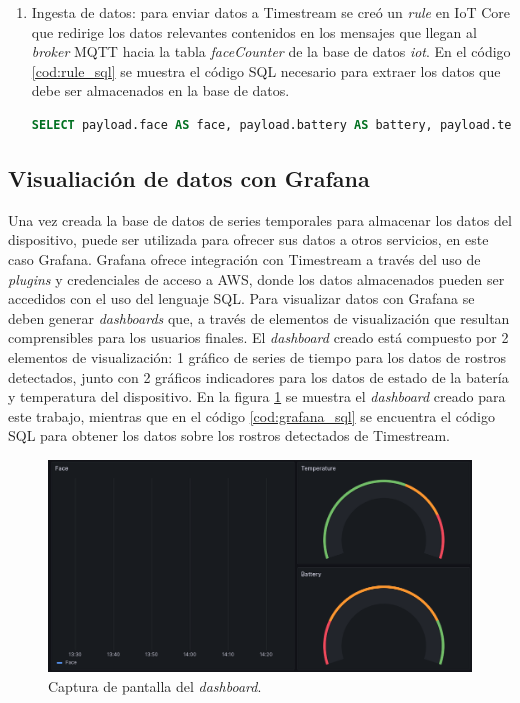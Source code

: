 \begin{enumerate}
	\item Ingesta de datos: para enviar datos a Timestream se creó un \textit{rule} en IoT Core que redirige los datos relevantes contenidos en los mensajes que llegan al \textit{broker} MQTT hacia la tabla \textit{faceCounter} de la base de datos \textit{iot}. En el código \ref{cod:rule_sql} se muestra el código SQL necesario para extraer los datos que debe ser almacenados en la base de datos.
\begin{lstlisting}[language=SQL, label=cod:rule_sql,caption=Código SQL del \textit{rule} para alcenar datos en Timestream.]
SELECT payload.face AS face, payload.battery AS battery, payload.temperature AS temperature FROM 'faceCounter/data_in'
\end{lstlisting}	
	
\end{enumerate}

\subsection{Visualiación de datos con Grafana}
Una vez creada la base de datos de series temporales para almacenar los datos del dispositivo, puede ser utilizada para ofrecer sus datos a otros servicios, en este caso Grafana. Grafana ofrece integración con Timestream a través del uso de \textit{plugins} y credenciales de acceso a AWS, donde los datos almacenados pueden ser accedidos con el uso del lenguaje SQL. Para visualizar datos con Grafana se deben generar \textit{dashboards} que, a través de elementos de visualización que resultan comprensibles para los usuarios finales. El \textit{dashboard} creado está compuesto por 2 elementos de visualización: 1 gráfico de series de tiempo para los datos de rostros detectados, junto con 2 gráficos indicadores para los datos de estado de la batería y temperatura del dispositivo. En la figura \ref{fig:gr_dashboard} se muestra el \textit{dashboard} creado para este trabajo, mientras que en el código \ref{cod:grafana_sql} se encuentra el código SQL para obtener los datos sobre los rostros detectados de Timestream.

\begin{figure}[h]
	\centering
	\includegraphics[scale=0.35]{./Figures/cc_dashboard.png}
	\caption{Captura de pantalla del \textit{dashboard}.}
	\label{fig:gr_dashboard}
\end{figure}

